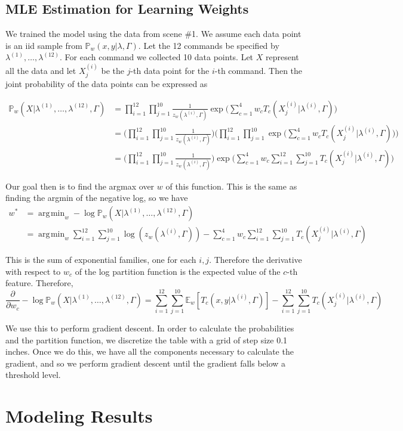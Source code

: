 \documentclass[12pt,letterpaper]{article}
\newcommand\prob{\mathbb{P}}
\newcommand\E{\mathbb{E}}
\DeclareMathOperator*{\argmin}{\arg\!\min}
\begin{document}
\subsection*{MLE Estimation for Learning Weights}
We trained the model using the data from scene \#1. We assume each data point is an iid sample from $\prob_w(x, y|\lambda, \Gamma)$. Let the 12 commands be specified by $\lambda^{(1)}, \ldots, \lambda^{(12)}$. For each command we collected 10 data points. Let $X$ represent all the data and let $X^{(i)}_j$ be the $j$-th data point for the $i$-th command. Then the joint probability of the data points can be expressed as

\begin{equation*}
\begin{split}
\prob_w(X|\lambda^{(1)}, \ldots, \lambda^{(12)}, \Gamma) &= \prod_{i = 1}^{12}\prod_{j = 1}^{10} \frac{1}{z_w(\lambda^{(i)}, \Gamma)}\exp\bigg(\sum_{c = 1}^4w_cT_c(X^{(i)}_j|\lambda^{(i)}, \Gamma)\bigg) \\
&= \bigg(\prod_{i = 1}^{12}\prod_{j = 1}^{10} \frac{1}{z_w(\lambda^{(i)}, \Gamma)}\bigg)\bigg(\prod_{i = 1}^{12}\prod_{j = 1}^{10}\exp\bigg(\sum_{c = 1}^4w_cT_c(X^{(i)}_j|\lambda^{(i)}, \Gamma)\bigg)\bigg) \\
&= \bigg(\prod_{i = 1}^{12}\prod_{j = 1}^{10} \frac{1}{z_w(\lambda^{(i)}, \Gamma)}\bigg)\exp\bigg(\sum_{c = 1}^4w_c\sum_{i = 1}^{12}\sum_{j = 1}^{10}T_c(X^{(i)}_j|\lambda^{(i)}, \Gamma)\bigg)
\end{split}
\end{equation*}

Our goal then is to find the argmax over $w$ of this function. This is the same as finding the argmin of the negative log, so we have
\begin{equation*}
\begin{split}
w^* &= \argmin_w -\log\prob_w(X|\lambda^{(1)}, \ldots, \lambda^{(12)}, \Gamma) \\
&= \argmin_w \sum_{i = 1}^{12}\sum_{j = 1}^{10}\log(z_w(\lambda^{(i)}, \Gamma)) - \sum_{c = 1}^4w_c\sum_{i = 1}^{12}\sum_{j = 1}^{10}T_c(X^{(i)}_j|\lambda^{(i)}, \Gamma)
\end{split}
\end{equation*}

This is the sum of exponential families, one for each $i, j$. Therefore the derivative with respect to $w_c$ of the log partition function is the expected value of the $c$-th feature. Therefore, 
\[
\frac{\partial}{\partial w_c} -\log\prob_w(X|\lambda^{(1)}, \ldots, \lambda^{(12)}, \Gamma) = \sum_{i = 1}^{12}\sum_{j = 1}^{10} \E_w[T_c(x, y|\lambda^{(i)}, \Gamma)] - \sum_{i = 1}^{12}\sum_{j = 1}^{10}T_c(X^{(i)}_j|\lambda^{(i)}, \Gamma)
\]

We use this to perform gradient descent. In order to calculate the probabilities and the partition function, we discretize the table with a grid of step size 0.1 inches. Once we do this, we have all the components necessary to calculate the gradient, and so we perform gradient descent until the gradient falls below a threshold level.

\section*{Modeling Results}
\end{document}

